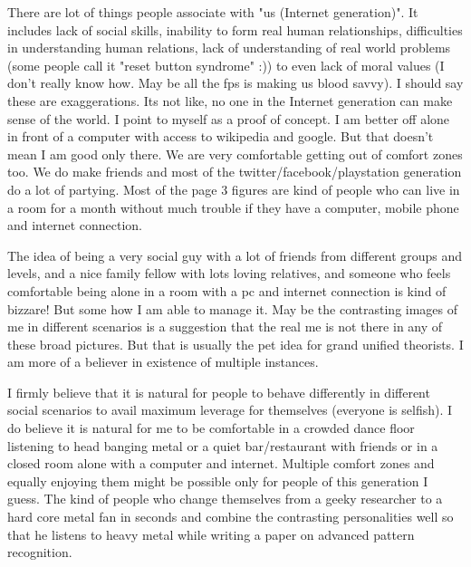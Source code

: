 {There are lot of things people associate with "us (Internet generation)". It includes lack of social skills, inability to 
form real human relationships, difficulties in understanding human relations, lack of understanding of real world 
problems (some people call it "reset button syndrome" :)) to even lack of moral values (I don't really know how. 
May be all the fps is making us blood savvy). I should say these are exaggerations. Its not like, no one in the 
Internet generation can make sense of the world. I point to myself as a proof of concept. I am better off alone in 
front of a computer with access to wikipedia and google. But that doesn't mean I am good only there. We are very 
comfortable getting out of comfort zones too. We do make friends and most of the twitter/facebook/playstation 
generation do a lot of partying. Most of the page 3 figures are kind of people who can live in a room for a month 
without much trouble if they have a computer, mobile phone and internet connection. 

The idea of being a very social guy with a lot of friends from different groups and levels, and a nice family fellow 
with lots loving relatives, and someone who feels comfortable being alone in a room with a pc and internet 
connection is kind of bizzare! But some how I am able to manage it. May be the contrasting images of me in 
different scenarios is a suggestion that the real me is not there in any of these broad pictures. But that is usually 
the pet idea for grand unified theorists. I am more of a believer in existence of multiple instances. 

I firmly believe that it is natural for people to behave differently in different social scenarios to avail maximum 
leverage for themselves (everyone is selfish). I do believe it is natural for me to be comfortable in a crowded 
dance floor listening to head banging metal or a quiet bar/restaurant with friends or in a closed room alone with 
a computer and internet. Multiple comfort zones and equally enjoying them might be possible only for people of 
this generation I guess. The kind of people who change themselves from a geeky researcher to a hard core 
metal fan in seconds and combine the contrasting personalities well so that he listens to heavy metal while 
writing a paper on advanced pattern recognition. 

}
